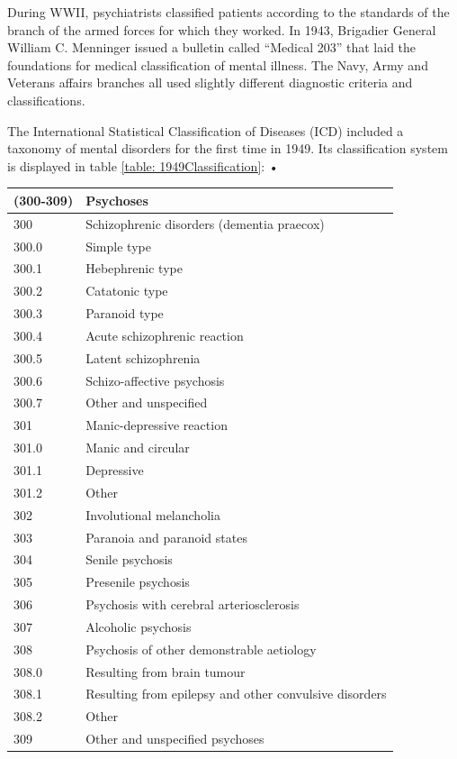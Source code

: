 During WWII, psychiatrists classified patients according to the standards of the branch of the armed forces for which they worked. In 1943, Brigadier General William C. Menninger issued a bulletin called ``Medical 203'' that laid the foundations for medical classification of mental illness. The Navy, Army and Veterans affairs branches all used slightly different diagnostic criteria and classifications.

The International Statistical Classification of Diseases (ICD) included a taxonomy of mental disorders for the first time in 1949. Its classification system is displayed in table \ref{table: 1949Classification}:
 •  \begin{longtable}[!t]{ | p{2cm} | p{11.8cm} | }
\hline

\textbf{(300-309)}&\textbf{Psychoses} \\ \hline
300&Schizophrenic disorders (dementia praecox) \\
300.0& Simple type\\
300.1& Hebephrenic type\\
300.2& Catatonic type\\
300.3& Paranoid type\\
300.4& Acute schizophrenic reaction\\
300.5& Latent schizophrenia\\
300.6& Schizo-affective psychosis\\
300.7& Other and unspecified\\
301&Manic-depressive reaction\\
301.0& Manic and circular\\
301.1& Depressive\\
301.2& Other\\
302&Involutional melancholia\\
303&Paranoia and paranoid states\\
304&Senile psychosis\\
305&Presenile psychosis\\
306&Psychosis with cerebral arteriosclerosis\\
307&Alcoholic psychosis\\
308&Psychosis of other demonstrable aetiology\\
308.0& Resulting from brain tumour\\
308.1& Resulting from epilepsy and other convulsive disorders\\
308.2& Other\\
309&Other and unspecified psychoses\\ \hline

\end{longtable}
